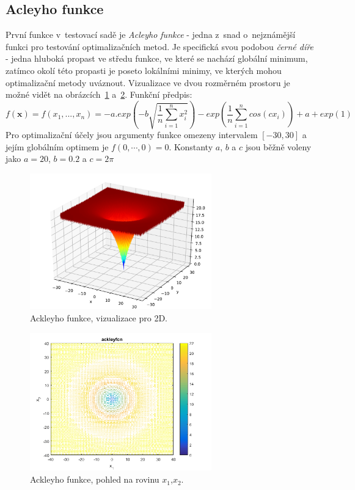 \subsection{Acleyho funkce}
První funkce v~testovací sadě je \textit{Acleyho funkce} - jedna z~snad o~nejznámější funkci pro testování optimalizačních metod. Je specifická svou podobou \textit{černé díře} - jedna hluboká propast ve středu funkce, ve které se nachází globální minimum, zatímco okolí této propasti je poseto lokálními minimy, ve kterých mohou optimalizační metody uváznout. Vizualizace ve dvou rozměrném prostoru je možné vidět na obrázcích~\ref{fg:acley} a~\ref{fg:acleyContour}. Funkční předpis:
\begin{equation}
f(\textbf{x}) = f(x_1, ..., x_n)= -a.exp(-b\sqrt{\frac{1}{n}\sum_{i=1}^{n}x_i^2})-exp(\frac{1}{n}\sum_{i=1}^{n}cos(cx_i))+ a + exp(1)
\label{eq:acley}
\end{equation}
Pro optimalizační účely jsou argumenty funkce omezeny intervalem $[-30, 30]$ a jejím globálním optimem je $f(0, \cdots, 0) = 0$. Konstanty $a$, $b$ a $c$ jsou běžně voleny jako $a = 20$, $b = 0.2$ a $c = 2\pi$

\begin{figure}[H]
	\centering
	\includegraphics[width=0.7\textwidth]{obrazky-figures/ackley.pdf}
	\caption{Ackleyho funkce, vizualizace pro 2D.}
	\label{fg:acley}
\end{figure}
\begin{figure}[H]
	\centering
	\includegraphics[width=0.7\textwidth]{obrazky-figures/ackleyfcn_contour.png}
	\caption{Ackleyho funkce, pohled na rovinu $x_1$,$x_2$.}
	\label{fg:acleyContour}
\end{figure}



